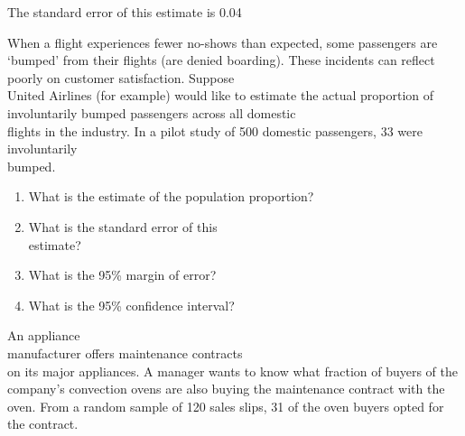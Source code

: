 \documentclass[11pt, chapterprefix=true]{scrbook}\usepackage[]{graphicx}\usepackage[]{color}
\begin{document}
\begin{exercises}
\begin{solution}
The standard error of this estimate is 0.04

\end{solution}

\begin{exercise} %

When a flight experiences fewer no-shows than expected, some passengers are `bumped' from their flights (are denied boarding).  These incidents can reflect poorly on customer satisfaction.  Suppose \\ United Airlines (for example) would like to estimate the actual proportion of involuntarily bumped passengers across all domestic \\ flights in the industry.  In a pilot study of 500 domestic passengers, 33 were involuntarily  \\ bumped.

\begin{enumerate}
\item	What is the estimate of the population proportion?
\item	What is the standard error of this \\ estimate?
\item	What is the 95\% margin of error?
\item	What is the 95\% confidence interval?
\end{enumerate}
\end{exercise}
%

\begin{exercise} %

An appliance \\ manufacturer offers maintenance contracts \\ on its major appliances.  A manager wants to know what fraction of buyers of the company's convection ovens are also buying the maintenance contract with the oven.  From a random sample of 120 sales slips, 31 of the oven buyers opted for the contract.


\end{exercise}
\end{exercises}
\end{document}
